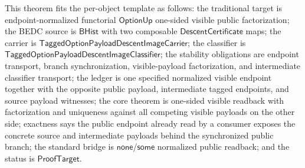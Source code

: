 \begin{theorem}
\label{thm:tagged-option-composite-image-classifier-normalized-one-sided-visible-public-factorization}
This theorem fits the per-object template as follows: the traditional target is
endpoint-normalized functorial $\mathsf{OptionUp}$ one-sided visible public
factorization; the BEDC source is $\mathsf{BHist}$ with two composable
$\mathsf{DescentCertificate}$ maps; the carrier is
$\mathsf{TaggedOptionPayloadDescentImageCarrier}$; the classifier is
$\mathsf{TaggedOptionPayloadDescentImageClassifier}$; the stability obligations
are endpoint transport, branch synchronization, visible-payload factorization,
and intermediate classifier transport; the ledger is one specified normalized
visible endpoint together with the opposite public payload, intermediate tagged
endpoints, and source payload witnesses; the core theorem is one-sided visible
readback with factorization and uniqueness against all competing visible payloads
on the other side; exactness says the public endpoint already read by a consumer
exposes the concrete source and intermediate payloads behind the synchronized
public branch; the standard bridge is $\mathsf{none}$/$\mathsf{some}$ normalized
public readback; and the status is $\mathsf{ProofTarget}$.


\end{theorem}
